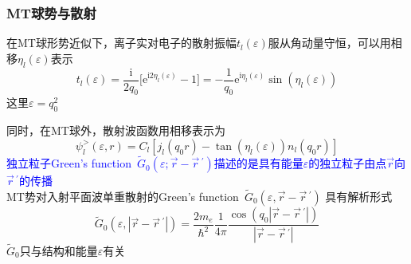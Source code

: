 \documentclass[cjk,slidestop,compress,mathserif,blue]{beamer}
\begin{document}
\frame
{
	\frametitle{\textrm{MT}球势与散射}
	在\textrm{MT}球形势近似下，离子实对电子的散射振幅$t_l(\varepsilon)$服从角动量守恒，可以用相移$\eta_l(\varepsilon)$表示
	$$t_l(\varepsilon)=\dfrac{\mathrm{i}}{2q_0}\big[\mathrm{e}^{\mathrm{i}2\eta_l(\varepsilon)}-1\big]=-\dfrac1{q_0}\mathrm{e}^{\mathrm{i}\eta_l(\varepsilon)}\sin(\eta_l(\varepsilon))$$
	这里$\varepsilon=q_0^2$

	同时，在\textrm{MT}球外，散射波函数用相移表示为
	$$\psi_l^{>}(\varepsilon,r)=C_l[j_l(q_0r)-\tan(\eta_l(\varepsilon))n_l(q_0r)]$$
	\textcolor{blue}{独立粒子\textrm{Green's function~}$\tilde G_0(\varepsilon;\vec r-\vec r\,^{\prime})$描述的是具有能量$\varepsilon$的独立粒子由点$\vec r$向$\vec r\,^{\prime}$的传播}\\
	\textrm{MT}势对入射平面波单重散射的\textrm{Green's function~}$\tilde G_0(\varepsilon,\vec r-\vec r\,^{\prime})$%
	具有解析形式
	$$\tilde G_0(\varepsilon,|\vec r-\vec r\,^{\prime}|)=\dfrac{2m_e}{\hbar^2}\dfrac1{4\pi}\dfrac{\cos(q_0|\vec r-\vec r\,^{\prime}|)}{|\vec r-\vec r\,^{\prime}|}$$
	$\tilde G_0$只与结构和能量$\varepsilon$有关%

}
\end{document}
